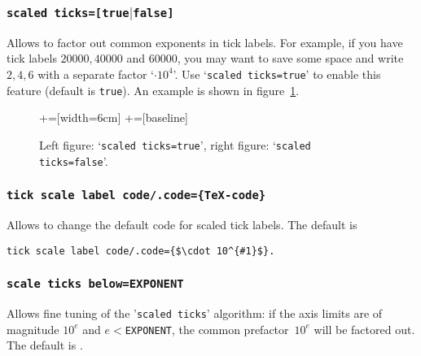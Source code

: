 \subsubsection{\texttt{scaled ticks=[true$|$false]}}
\label{sec:scaled:ticks}%
Allows to factor out common exponents in tick labels. For example, if you have tick labels $20000,40000$ and $60000$, you may want to save some space and write $2,4,6$ with a separate factor `$\cdot 10^4$'. Use `\texttt{scaled ticks=true}' to enable this feature (default is \texttt{true}). An example is shown in figure~\ref{fig:scaled:ticks}.

\begin{figure}
	\begin{center}
	+=[width=6cm]%
	+=[baseline]%
	\hspace{0.5cm}%
	\end{center}
	\caption{Left figure: `\texttt{scaled ticks=true}', right figure: `\texttt{scaled ticks=false}'.}
	\label{fig:scaled:ticks}
\end{figure}

\subsubsection{\texttt{tick scale label code/.code=\{\TeX-code\}}}
Allows to change the default code for scaled tick labels. The default is
\begin{lstlisting}
tick scale label code/.code={$\cdot 10^{#1}$}.
\end{lstlisting}

\subsubsection{\texttt{scale ticks below=EXPONENT}}
Allows fine tuning of the '\texttt{scaled ticks}' algorithm: if the axis limits are of magnitude $10^e$ and $e<$\texttt{EXPONENT}, the common prefactor~$10^e$ will be factored out. The default is 
\makeatletter
\pgfplots@scale@ticks@below@exponent
\makeatother.


